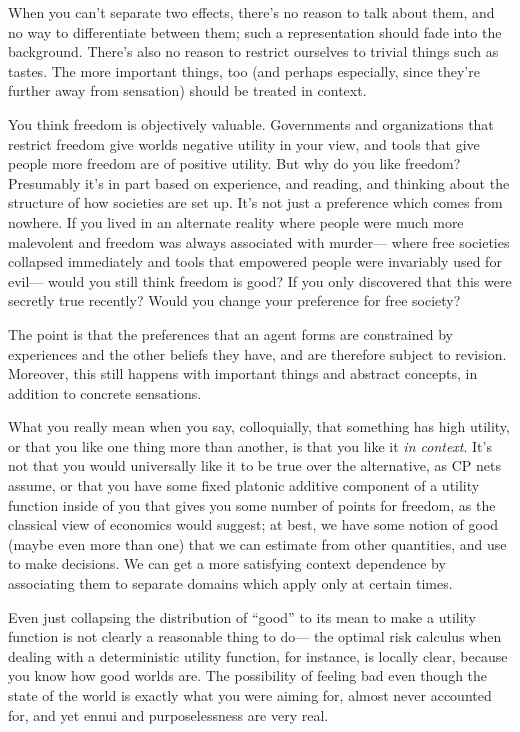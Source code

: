 \documentclass{article}
\begin{document}
	When you can't separate two effects, there's no reason to talk about them, and no way to differentiate between them; such a representation should fade into the background. There's also no reason to restrict ourselves to trivial things such as tastes. The more important things, too (and perhaps especially, since they're further away from sensation) should be treated in context.
	
	\begin{example}
		You think freedom is objectively valuable. Governments and organizations that restrict freedom give worlds negative utility in your view, and tools that give people more freedom are of positive utility. But why do you like freedom? Presumably it's in part based on experience, and reading, and thinking about the structure of how societies are set up. It's not just a preference which comes from nowhere. If you lived in an alternate reality where people were much more malevolent and freedom was always associated with murder--- where free societies collapsed immediately and tools that empowered people were invariably used for evil--- would you still think freedom is good? If you only discovered that this were secretly true recently? Would you change your preference for free society?
		
		The point is that the preferences that an agent forms are constrained by experiences and the other beliefs they have, and are therefore subject to revision. Moreover, this still happens with important things and abstract concepts, in addition to concrete sensations.
	\end{example}

	What you really mean when you say, colloquially, that something has high utility, or that you like one thing more than another, is that you like it \emph{in context}. It's not that you would universally like it to be true over the alternative, as CP nets assume, or that you have some fixed platonic additive component of a utility function inside of you that gives you some number of points for freedom, as the classical view of economics would suggest; at best, we have some notion of good (maybe even more than one) that we can estimate from other quantities, and use to make decisions. We can get a more satisfying context dependence by associating them to separate domains which apply only at certain times.
	
	Even just collapsing the distribution of ``good'' to its mean to make a utility function is not clearly a reasonable thing to do--- the optimal risk calculus when dealing with a deterministic utility function, for instance, is locally clear, because you know how good worlds are. The possibility of feeling bad even though the state of the world is exactly what you were aiming for, almost never accounted for, and yet ennui and purposelessness are very real.
	
\end{document}
